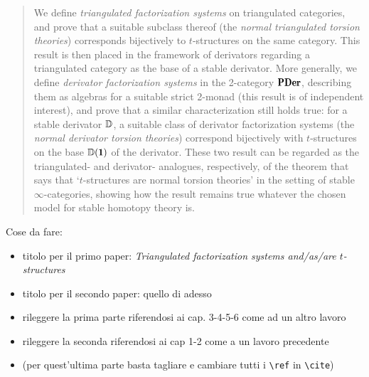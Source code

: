 \documentclass[a4paper,10pt]{amsart}
\begin{document}
\maketitle
\begin{abstract}
We define \emph{triangulated factorization systems} on triangulated categories, and prove that a suitable subclass thereof (the \emph{normal triangulated torsion theories}) corresponds bijectively to $t$-structures on the same category.
This result is then placed in the framework of derivators regarding a triangulated category as the base of a stable derivator. More generally, we define \emph{derivator factorization systems} in the 2-category $\PDer$, describing them as algebras for a suitable strict 2-monad (this result is of independent interest), and prove that a similar characterization still holds true: for a stable derivator $\mathbb{D}$, a suitable class of derivator factorization systems (the \emph{normal derivator torsion theories}) correspond bijectively with $t$-structures on the base $\D(\uno)$ of the derivator.
These two result can be regarded as the triangulated- and derivator- analogues, respectively, of the theorem that says that `$t$-structures are normal torsion theories' in the setting of stable $\infty$-categories, showing how the result remains true whatever the chosen model for stable homotopy theory is.
\end{abstract}

{\color{red} Cose da fare:
\begin{itemize}
\item titolo per il primo paper: \emph{Triangulated factorization systems and/as/are $t$-structures}
\item titolo per il secondo paper: quello di adesso
\item rileggere la prima parte riferendosi ai cap. 3-4-5-6 come ad un altro lavoro
\item rileggere la seconda riferendosi ai cap 1-2 come a un lavoro precedente
\item (per quest'ultima parte basta tagliare e cambiare tutti i \verb|\ref| in \verb|\cite|)
\end{itemize}
}

\tableofcontents



% 
% 
% 
% 



\end{document}
